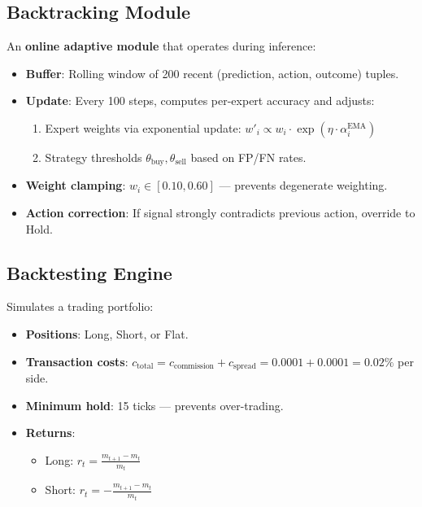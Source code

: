 \documentclass[12pt, a4paper]{article}
\begin{document}
\subsection{Backtracking Module}

An \textbf{online adaptive module} that operates during inference:

\begin{itemize}
  \item \textbf{Buffer}: Rolling window of 200 recent (prediction, action, outcome) tuples.
  \item \textbf{Update}: Every 100 steps, computes per-expert accuracy and adjusts:
  \begin{enumerate}
    \item Expert weights via exponential update: $w'_i \propto w_i \cdot \exp(\eta \cdot \alpha_i^{\text{EMA}})$
    \item Strategy thresholds $\theta_{\text{buy}}, \theta_{\text{sell}}$ based on FP/FN rates.
  \end{enumerate}
  \item \textbf{Weight clamping}: $w_i \in [0.10, 0.60]$ — prevents degenerate weighting.
  \item \textbf{Action correction}: If signal strongly contradicts previous action, override to Hold.
\end{itemize}

\subsection{Backtesting Engine}

Simulates a trading portfolio:

\begin{itemize}
  \item \textbf{Positions}: Long, Short, or Flat.
  \item \textbf{Transaction costs}: $c_{\text{total}} = c_{\text{commission}} + c_{\text{spread}} = 0.0001 + 0.0001 = 0.02\%$ per side.
  \item \textbf{Minimum hold}: 15 ticks — prevents over-trading.
  \item \textbf{Returns}:
  \begin{itemize}
    \item Long: $r_t = \frac{m_{t+1} - m_t}{m_t}$
    \item Short: $r_t = -\frac{m_{t+1} - m_t}{m_t}$
  \end{itemize}
\end{itemize}
\end{document}
